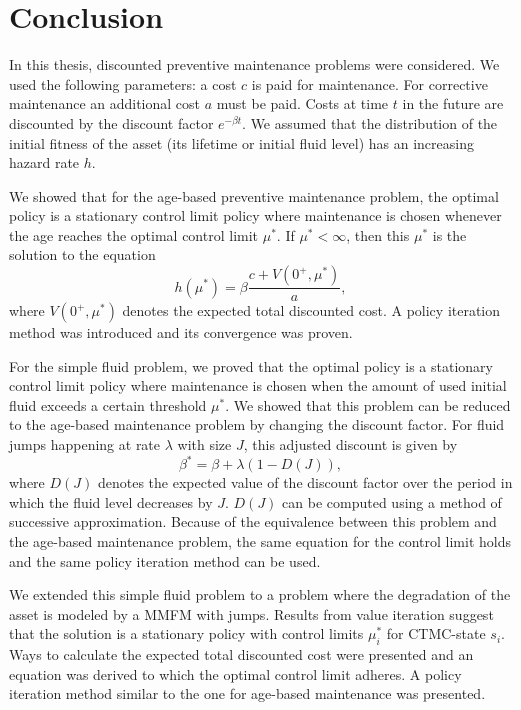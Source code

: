 \documentclass[a4paper]{thesis}
\theoremstyle{definition}
\begin{document}
\chapter{Conclusion}\label{chapter:Conclusion}

In this thesis, discounted preventive maintenance problems were considered.
We used the following parameters:
a cost $c$ is paid for maintenance.
For corrective maintenance an additional cost $a$ must be paid.
Costs at time $t$ in the future are discounted by the discount factor $e^{-\beta t}$.
We assumed that the distribution of the initial fitness of the asset (its lifetime or initial fluid level) has an increasing hazard rate $h$.

We showed that for the age-based preventive maintenance problem, the optimal policy is a stationary control limit policy where maintenance is chosen whenever the age reaches the optimal control limit $\mu^*$.
If $\mu^*<\infty$, then this $\mu^*$ is the solution to the equation
\begin{equation}\label{eq:SummaryAgeControlLimit}
h(\mu^*)=\beta\frac{c+V(0^+,\mu^*)}{a},
\end{equation}
where $V(0^+,\mu^*)$ denotes the expected total discounted cost.
A policy iteration method was introduced and its convergence was proven.

For the simple fluid problem, we proved that the optimal policy is a stationary control limit policy where maintenance is chosen when the amount of used initial fluid exceeds a certain threshold $\mu^*$.
We showed that this problem can be reduced to the age-based maintenance problem by changing the discount factor.
For fluid jumps happening at rate $\lambda$ with size $J$, this adjusted discount is given by
\[
\beta^*=\beta+\lambda(1-D(J)),
\]
where $D(J)$ denotes the expected value of the discount factor over the period in which the fluid level decreases by $J$.
$D(J)$ can be computed using a method of successive approximation.
Because of the equivalence between this problem and the age-based maintenance problem, the same equation for the control limit holds and the same policy iteration method can be used.

We extended this simple fluid problem to a problem where the degradation of the asset is modeled by a MMFM with jumps.
Results from value iteration suggest that the solution is a stationary policy with control limits $\mu_i^*$ for CTMC-state $s_i$.
Ways to calculate the expected total discounted cost were presented and an equation was derived to which the optimal control limit adheres.
A policy iteration method similar to the one for age-based maintenance was presented.
\end{document}
